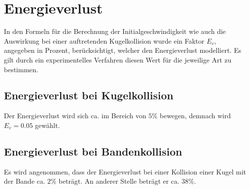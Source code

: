 \section{Energieverlust}
In den Formeln für die Berechnung der Initialgeschwindigkeit wie auch die Auswirkung bei einer auftretenden Kugelkollision
wurde ein Faktor $E_v$, angegeben in Prozent, berücksichtigt, welcher den Energieverlust modelliert.
Es gilt durch ein experimentelles Verfahren diesen Wert für die jeweilige Art zu bestimmen.

\subsection{Energieverlust bei Kugelkollision}
Der Energieverlust wird sich ca. im Bereich von $5\%$\cite{unikoblenz:entwicklungvirtuellesbillarspiel} bewegen, demnach wird $E_v = 0.05$ gewählt.

\subsection{Energieverlust bei Bandenkollision}
Es wird angenommen, dass der Energieverlust bei einer Kollision einer Kugel mit der Bande ca. $2\%$ beträgt\cite{10.1243/09544062JMES1964}.
An anderer Stelle beträgt er ca. $38\%$\cite{billardaktuell:thescienceofpocketbillards}.
